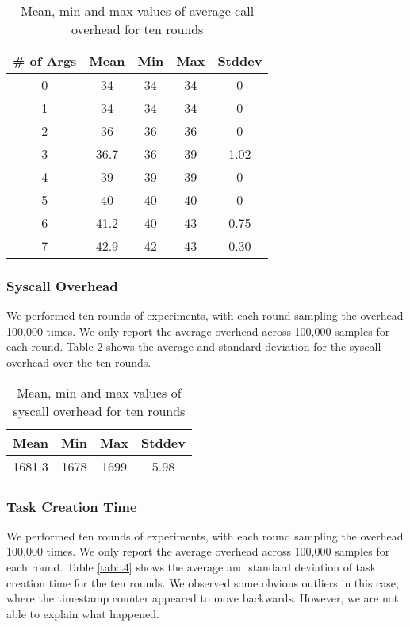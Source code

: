 \begin{table}[htb]

\caption{Mean, min and max values of average call overhead for ten rounds}

    \begin{tabular}{|c|c|c|c|c|} 
     \hline
     \# of Args & Mean & Min & Max & Stddev \\ 
     \hline
     0 & 34 & 34 & 34 & 0 \\ 
     \hline
     1 & 34 & 34 & 34 & 0\\ 
     \hline
     2 & 36 & 36 & 36 & 0\\ 
     \hline
     3 & 36.7 & 36 & 39 & 1.02\\ 
     \hline
     4 & 39 & 39 & 39 & 0\\ 
     \hline
     5 & 40 & 40 & 40 & 0\\ 
     \hline
     6 & 41.2 & 40 & 43 & 0.75 \\ 
     \hline
     7 & 42.9 & 42 & 43 & 0.30\\ 
     \hline
    \end{tabular}
    \label{tab:t2}
\end{table}


\subsubsection{Syscall Overhead}
We performed ten rounds of experiments, with each round sampling the
overhead 100,000 times.
%
We only report the average overhead across 100,000 samples for each
round.
%
Table \ref{tab:t3} shows the average and standard deviation for the
syscall overhead over the ten rounds.

\begin{table}[tb]

    \caption{Mean, min and max values of syscall overhead for ten rounds}
    
    \begin{tabular}{|c|c|c|c|} 
        \hline
        Mean & Min & Max & Stddev\\ 
        \hline
        1681.3 & 1678 & 1699 & 5.98\\ 
        \hline
       \end{tabular}
        \label{tab:t3}
\end{table}

    
\subsubsection{Task Creation Time}
\label{subsubsec:tct}
We performed ten rounds of experiments, with each round sampling the
overhead 100,000 times. %
We only report the average overhead across 100,000 samples for each
round. %
Table \ref{tab:t4} shows the average and standard deviation of task
creation time for the ten rounds. %
We observed some obvious outliers in this case, where the timestamp
counter appeared to move backwards. %
However, we are not able to explain what happened.

